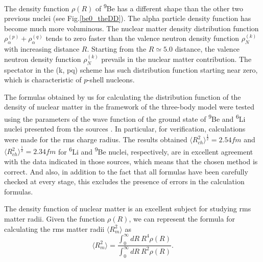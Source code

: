 \documentclass[
12pt, %
oneside, %
english, %
onehalfspacing, %
onehalfspacing, %
headsepline, %
]{MastersDoctoralThesis} %
\newcommand{\li}{\textsuperscript{6}Li\xspace}
\newcommand{\be}{\textsuperscript{9}Be\xspace}
\begin{document}
The density function $\rho(R)$ of \be has a different shape than the other two previous nuclei (see Fig.\ref{be0_theDD}). The alpha particle density function has become much more voluminous. The nuclear matter density distribution function $\rho_{\alpha}^{(p)}+\rho_{\alpha}^{(q)}$ tends to zero faster than the valence neutron density function $\rho_{N}^{(k)}$ with increasing distance $R$. Starting from the $R \simeq 5.0 $ distance, the valence neutron density function $\rho_{N}^{(k)}$  prevails in the nuclear matter contribution. The spectator in the (k, pq) scheme has such distribution function starting near zero, which is characteristic of $p$-shell nucleons.

The formulas obtained by us for calculating the distribution function of the density of nuclear matter in the framework of the three-body model were tested using the parameters of the wave function of the ground state of \be and \li nuclei presented from the sources \cite{voronchev1994study, pomerantsevPrivate}. In particular, for verification, calculations were made for the rms charge radius. The results obtained $\langle R_{ch}^2 \rangle^{\frac{1}{2}} = 2.54 fm$  and $\langle R_{ch}^2 \rangle^{\frac{1}{2}} = 2.34 fm$ for \li and \be nuclei, respectively, are in excellent agreement with the data indicated in those sources, which means that the chosen method is correct. And also, in addition to the fact that all formulas have been carefully checked at every stage, this excludes the presence of errors in the calculation formulas.

The density function of nuclear matter is an excellent subject for studying rms matter radii. Given the function $\rho(R)$, we can represent the formula for calculating the rms matter radii  $\langle R_{m}^2 \rangle$ as
\begin{equation}
\langle R_{m}^2 \rangle = 
\frac{
\int_0^{\infty} dR~ R^{4} \rho(R)
}{
\int_0^{\infty} dR~ R^{2} \rho(R)
}.
\end{equation}
\end{document}
